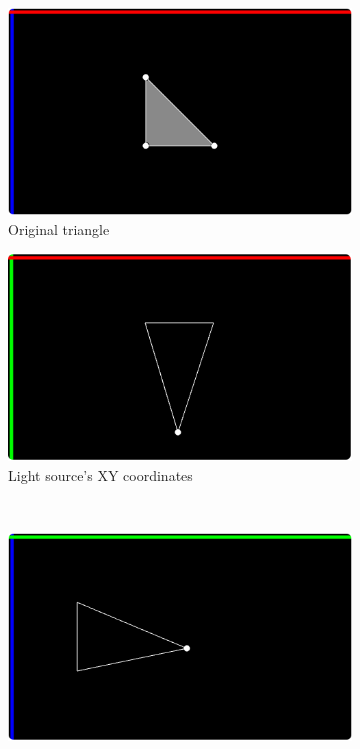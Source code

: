 \documentclass[11pt]{extarticle}
\begin{document}
    \begin{figure}[!ht]
        \begin{subfigure}{.5\textwidth}
            \centering
            \includegraphics[scale=.5]{p5_1.png}
            \caption{Original triangle}
        \end{subfigure}
        \begin{subfigure}{.5\textwidth}
            \centering
            \includegraphics[scale=.5]{p5_2.png}
            \caption{Light source's XY coordinates}
        \end{subfigure}
        \\
        \begin{subfigure}{.5\textwidth}
            \centering
            \includegraphics[scale=.5]{p5_3.png}

\end{subfigure}
\end{figure}
\end{document}
